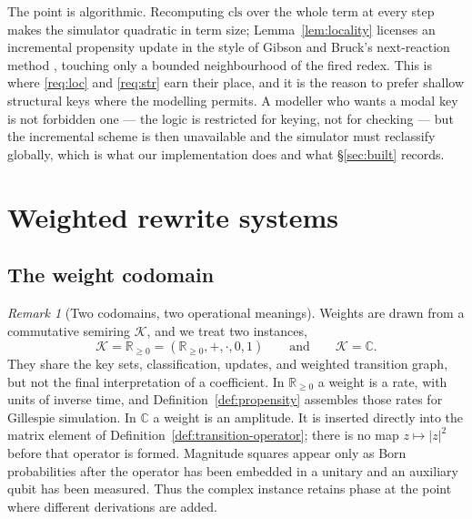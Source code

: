 \documentclass[11pt,a4paper]{article}
\theoremstyle{plain}
\theoremstyle{definition}
\theoremstyle{remark}
\newtheorem{remark}[theorem]{Remark}
\newcommand{\Rnn}{\mathbb{R}_{\geq 0}}
\newcommand{\Cx}{\mathbb{C}}
\newcommand{\class}{\mathrm{cls}}
\begin{document}
The point is algorithmic. Recomputing $\class$ over the whole term at every step makes the simulator
quadratic in term size; Lemma~\ref{lem:locality} licenses an incremental propensity update in the
style of Gibson and Bruck's next-reaction method \cite{gibson-bruck}, touching only a bounded
neighbourhood of the fired redex. This is where \ref{req:loc} and \ref{req:str} earn their place, and
it is the reason to prefer shallow structural keys where the modelling permits. A modeller who wants
a modal key is not forbidden one --- the logic is restricted for keying, not for checking --- but the
incremental scheme is then unavailable and the simulator must reclassify globally, which is what our
implementation does and what \S\ref{sec:built} records.

\section{Weighted rewrite systems}
\label{sec:weighted}

\subsection{The weight codomain}

\begin{remark}[Two codomains, two operational meanings]
\label{rem:codomain}
Weights are drawn from a commutative semiring $\mathcal{K}$, and we treat two instances,
\[
\mathcal{K}=\Rnn=(\Rnn,+,\cdot,0,1)
\qquad\text{and}\qquad
\mathcal{K}=\Cx.
\]
They share the key sets, classification, updates, and weighted transition graph, but not the final
interpretation of a coefficient. In $\Rnn$ a weight is a rate, with units of inverse time, and
Definition~\ref{def:propensity} assembles those rates for Gillespie simulation. In $\Cx$ a weight is
an amplitude. It is inserted directly into the matrix element of
Definition~\ref{def:transition-operator}; there is no map $z\mapsto |z|^2$ before that operator is
formed. Magnitude squares appear only as Born probabilities after the operator has been embedded in a
unitary and an auxiliary qubit has been measured. Thus the complex instance retains phase at the
point where different derivations are added.
\end{remark}
\end{document}
